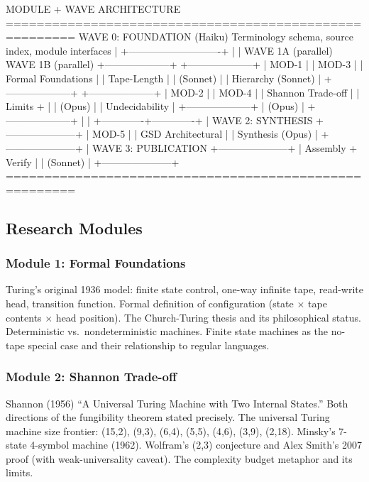 \documentclass[11pt,letterpaper]{article}
\begin{document}
\begin{asciibox}
MODULE + WAVE ARCHITECTURE
=======================================================
  WAVE 0: FOUNDATION (Haiku)
  Terminology schema, source index, module interfaces
     |
     +----------------------------+
     |                            |
  WAVE 1A (parallel)          WAVE 1B (parallel)
  +--------------------+      +--------------------+
  | MOD-1              |      | MOD-3              |
  | Formal Foundations |      | Tape-Length        |
  | (Sonnet)           |      | Hierarchy (Sonnet) |
  +--------------------+      +--------------------+
  | MOD-2              |      | MOD-4              |
  | Shannon Trade-off  |      | Limits +           |
  | (Opus)             |      | Undecidability     |
  +--------------------+      | (Opus)             |
                               +--------------------+
          |                           |
          +-------------+-------------+
                        |
                 WAVE 2: SYNTHESIS
              +---------------------+
              | MOD-5               |
              | GSD Architectural   |
              | Synthesis  (Opus)   |
              +---------------------+
                        |
               WAVE 3: PUBLICATION
              +---------------------+
              | Assembly + Verify   |
              | (Sonnet)            |
              +---------------------+
=======================================================
\end{asciibox}

\subsection{Research Modules}

\subsubsection{Module 1: Formal Foundations}
Turing's original 1936 model: finite state control, one-way infinite tape, read-write head, transition function. Formal definition of configuration (state $\times$ tape contents $\times$ head position). The Church-Turing thesis and its philosophical status. Deterministic vs.\ nondeterministic machines. Finite state machines as the no-tape special case and their relationship to regular languages.

\subsubsection{Module 2: Shannon Trade-off}
Shannon (1956) ``A Universal Turing Machine with Two Internal States.'' Both directions of the fungibility theorem stated precisely. The universal Turing machine size frontier: (15,2), (9,3), (6,4), (5,5), (4,6), (3,9), (2,18). Minsky's 7-state 4-symbol machine (1962). Wolfram's (2,3) conjecture and Alex Smith's 2007 proof (with weak-universality caveat). The complexity budget metaphor and its limits.
\end{document}
